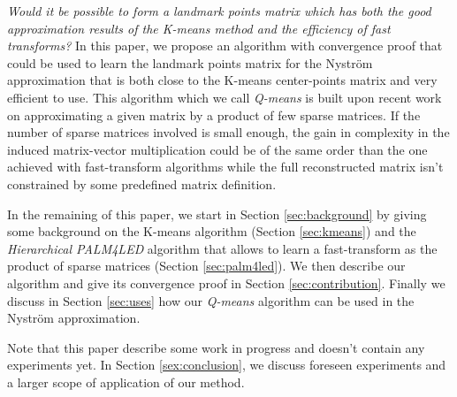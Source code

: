 \textit{Would it be possible to form a landmark points matrix which has both the good approximation results of the K-means method and the efficiency of fast transforms?} In this paper, we propose an algorithm with convergence proof that could be used to learn the landmark points matrix for the Nyström approximation that is both close to the K-means center-points matrix and very efficient to use. This algorithm which we call \textit{Q-means} is built upon recent work \cite{magoarou2014learning} on approximating a given matrix by a product of few sparse matrices. If the number of sparse matrices involved is small enough, the gain in complexity in the induced matrix-vector multiplication could be of the same order than the one achieved with fast-transform algorithms while the full reconstructed matrix isn't constrained by some predefined matrix definition.

In the remaining of this paper, we start in Section \ref{sec:background} by giving some background on the K-means algorithm (Section \ref{sec:kmeans}) and the \textit{Hierarchical PALM4LED} algorithm that allows to learn a fast-transform as the product of sparse matrices (Section \ref{sec:palm4led}). We then describe our algorithm and give its convergence proof in Section \ref{sec:contribution}. Finally we discuss in Section \ref{sec:uses} how our \textit{Q-means} algorithm can be used in the Nyström approximation.

Note that this paper describe some work in progress and doesn't contain any experiments yet. In Section \ref{sex:conclusion}, we discuss foreseen experiments and a larger scope of application of our method.
